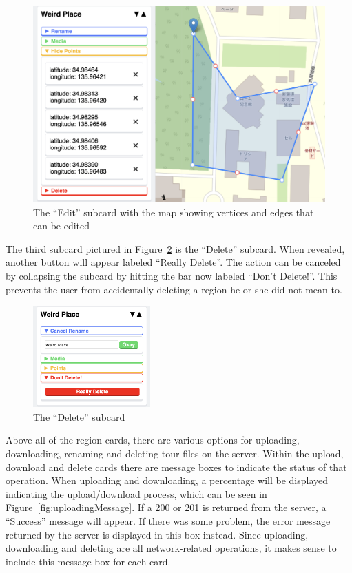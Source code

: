 \documentclass[a4paper, 10pt, american, titlepage]{article}
\begin{document}
\begin{figure}[h]
	\centering
    \includegraphics[width=\textwidth]{edit-subcard-with-map-editour.png}
    \caption{The ``Edit'' subcard with the map showing vertices and edges that
    can be edited}
	\label{fig:editSubcardWithMap}
\end{figure}

The third subcard pictured in Figure~\ref{fig:deleteSubcard} is the ``Delete''
subcard. When revealed, another button will appear labeled ``Really Delete''.
The action can be canceled by collapsing the subcard by hitting the bar now
labeled ``Don't Delete!''. This prevents the user from accidentally deleting a
region he or she did not mean to.

\begin{figure}[h]
	\centering
    \includegraphics[width=0.4\textwidth]{delete-subcard-editour.png}
    \caption{The ``Delete'' subcard}
	\label{fig:deleteSubcard}
\end{figure}

Above all of the region cards, there are various options for uploading,
downloading, renaming and deleting tour files on the server. Within the upload,
download and delete cards there are message boxes to indicate the status of
that operation. When uploading and downloading, a percentage will be displayed
indicating the upload/download process, which can be seen in
Figure~\ref{fig:uploadingMessage}. If a 200 or 201 is returned from the server,
a ``Success'' message will appear. If there was some problem, the error message
returned by the server is displayed in this box instead. Since uploading,
downloading and deleting are all network-related operations, it makes sense to
include this message box for each card.
\end{document}
